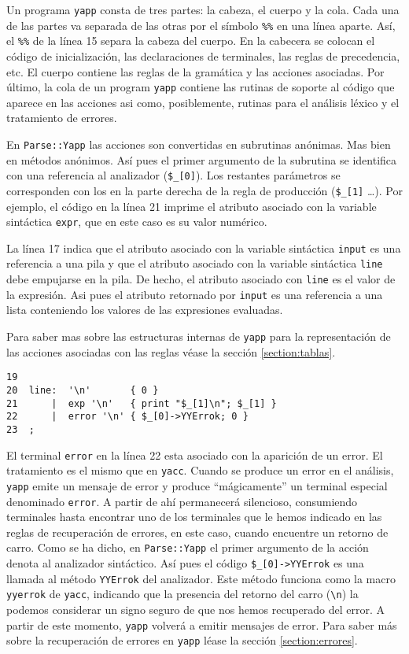 Un programa \verb|yapp| consta de tres partes: la cabeza, el cuerpo
y la cola. Cada una de las partes va separada de las otras por el
símbolo \verb|%%| en una línea aparte. Así, el \verb|%%| de la línea 15
separa la cabeza del cuerpo. En la cabecera se colocan el
código de inicialización, las declaraciones de terminales, las reglas
de precedencia, etc.  El cuerpo contiene las reglas de la gramática y
las acciones asociadas. Por último, la cola de un program \verb|yapp|
contiene las rutinas de soporte al código que aparece en las acciones 
asi como, posiblemente, rutinas para el análisis léxico 
y el tratamiento de errores.

En \verb|Parse::Yapp| las acciones son convertidas en subrutinas
anónimas. Mas bien en métodos anónimos. 
Así pues el primer argumento de la subrutina se identifica con 
una referencia al analizador (\verb|$_[0]|).  Los restantes parámetros
se corresponden con los 
en la parte derecha de la regla de producción (\verb|$_[1]| \ldots ).
Por ejemplo, el código en la línea 21 imprime el atributo asociado
con la variable sintáctica \verb|expr|, que en este caso es su valor numérico.

La línea 17 indica que el atributo asociado con la variable
sintáctica \verb|input| es una referencia
a una pila y que el atributo asociado con la variable sintáctica
\verb|line| debe empujarse
en la pila. De hecho, el atributo asociado con \verb|line| es el valor
de la expresión. Asi pues el atributo retornado por \verb|input| es
una referencia a una lista conteniendo los valores de las expresiones
evaluadas.

Para saber mas sobre las estructuras internas de 
\verb|yapp| para la representación  de las acciones asociadas con las reglas
véase la sección \ref{section:tablas}.


\begin{verbatim}
19  
20  line:  '\n'       { 0 }
21      |  exp '\n'   { print "$_[1]\n"; $_[1] }
22      |  error '\n' { $_[0]->YYErrok; 0 }
23  ;
\end{verbatim}

El terminal
\verb|error| en la línea 22 esta asociado con la aparición de un error.
El tratamiento es el mismo que en \verb|yacc|. Cuando se produce un error
en el análisis, \verb|yapp| emite un mensaje de error y
produce ``mágicamente'' un terminal especial denominado
\verb|error|. A partir de ahí permanecerá silencioso,
consumiendo terminales hasta encontrar uno de los terminales que le
hemos indicado en las reglas de recuperación de errores,
en este caso, cuando encuentre un retorno de carro.
Como se ha dicho, en \verb|Parse::Yapp| el primer argumento de la acción denota al 
analizador sintáctico. Así pues el código \verb|$_[0]->YYErrok|
es una llamada al método \verb|YYErrok| del analizador. Este método
funciona como la macro \verb|yyerrok| de \verb|yacc|, indicando 
que la presencia del retorno del carro (\verb|\n|) la podemos considerar
un signo seguro de que nos hemos recuperado del error. A partir
de este momento, \verb|yapp| volverá a emitir mensajes de error.
Para saber más sobre la recuperación de 
errores en \verb|yapp| léase la sección
\ref{section:errores}.

